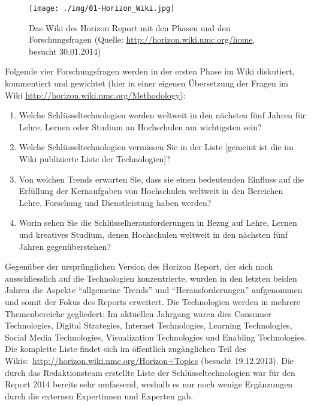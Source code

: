 \documentclass[a4paper,
fontsize=11pt,
oneside,
numbers=noperiodatend,
parskip=half-,
bibliography=totoc,
final
]{scrartcl}
\begin{document}
\begin{figure}[htbp]
\centering
\texttt{[image: ./img/01-Horizon\_Wiki.jpg]}
\caption{Das Wiki des Horizon Report mit den Phasen und den
Forschungsfragen (Quelle: \url{http://horizon.wiki.nmc.org/home},
besucht 30.01.2014)}
\end{figure}

Folgende vier Forschungsfragen werden in der ersten Phase im Wiki
diskutiert, kommentiert und gewichtet (hier in einer eigenen Übersetzung
der Fragen im Wiki \url{http://horizon.wiki.nmc.org/Methodology}):~

\begin{enumerate}
\def\labelenumi{\arabic{enumi}.}
\item
  Welche Schlüsseltechnologien werden weltweit in den nächsten fünf
  Jahren für Lehre, Lernen oder Studium an Hochschulen am wichtigsten
  sein?
\item
  Welche Schlüsseltechnologien vermissen Sie in der Liste {[}gemeint ist
  die im Wiki publizierte Liste der Technologien{]}?
\item
  Von welchen Trends erwarten Sie, dass sie einen bedeutenden Einfluss
  auf die Erfüllung der Kernaufgaben von Hochschulen weltweit in den
  Bereichen Lehre, Forschung und Dienstleistung haben werden?
\item
  Worin sehen Sie die Schlüsselherausforderungen in Bezug auf Lehre,
  Lernen und kreatives Studium, denen Hochschulen weltweit in den
  nächsten fünf Jahren gegenüberstehen?
\end{enumerate}

Gegenüber der ursprünglichen Version des Horizon Report, der sich noch
ausschliesslich auf die Technologien konzentrierte, wurden in den
letzten beiden Jahren die Aspekte \enquote{allgemeine Trends} und
\enquote{Herausforderungen} aufgenommen und somit der Fokus des Reports
erweitert. Die Technologien werden in mehrere Themenbereiche gegliedert:
Im aktuellen Jahrgang waren dies Consumer Technologies, Digital
Strategies, Internet Technologies, Learning Technologies, Social Media
Technologies, Visualization Technologies und Enabling Technologies. Die
komplette Liste findet sich im öffentlich zugänglichen Teil des
Wikis:~\url{http://horizon.wiki.nmc.org/Horizon+Topics} (besucht
19.12.2013). Die durch das Redaktionsteam erstellte Liste der
Schlüsseltechnologien war für den Report 2014 bereits sehr umfassend,
weshalb es nur noch wenige Ergänzungen durch die externen Expertinnen
und Experten gab.
\end{document}
